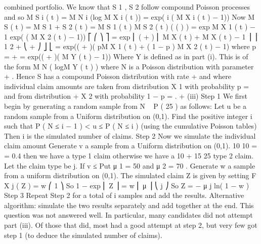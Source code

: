 \documentclass[a4paper,12pt]{article}
\begin{document}
combined portfolio. We know that S 1 , S 2 follow compound Poisson processes
and so
M S i ( t ) = M N i (log M X i ( t )) = exp( \lambda i ( M X i ( t ) − 1))
Now
M S ( t ) = M S 1 + S 2 ( t ) = M S 1 ( t ) M S 2 ( t )
( (
) )
= exp  M X 1 ( t ) − 1 exp(  ( M X 2 ( t ) − 1))
⎡
⎛ 
⎞ ⎤
= exp ⎢ (  +  ) ⎜
M X ( t ) +
M X ( t ) − 1 ⎟ ⎥
1
2
 + 
⎝  + 
⎠ ⎦
⎣
= exp((  +  )( pM X 1 ( t ) + ( 1 − p ) M X 2 ( t ) − 1) where p =
 + 
= exp((  +  )( M Y ( t ) − 1))
Where Y is defined as in part (i). This is of the form M N ( logM Y ( t ) ) where N
is a Poisson distribution with parameter  +  . Hence S has a compound
Poisson distribution with rate  +  and where individual claim amounts are
taken from distribution X 1 with probability p =
and from distribution
 + 
X 2 with probability 1 − p =
.
 + 
(iii)
Step 1
We first begin by generating a random sample from N ~ P ( 25 ) as follows:
Let u be a random sample from a Uniform distribution on (0,1).
Find the positive integer i such that P ( N ≤ i − 1 ) < u ≤ P ( N ≤ i ) (using the
cumulative Poisson tables)
Then i is the simulated number of claims.
Step 2
Now we simulate the individual claim amount
Generate v a sample from a Uniform distribution on (0,1).
10
10
=
= 0.4 then we have a type 1 claim otherwise we have a
10 + 15 25
type 2 claim. Let the claim type be j.
If v ≤
Put μ 1 = 50 and μ 2 = 70 . Generate w a sample from a uniform distribution on
(0,1).
The simulated claim Z is given by setting
F X j ( Z ) = w
⎛ 1 ⎞
So 1 − exp ⎜
Z ⎟ = w
⎜ μ
⎟
⎝ j ⎠
So Z = − μ j ln( 1 − w )
Step 3
Repeat Step 2 for a total of i samples and add the results.
Alternative algorithm: simulate the two results separately and add together at
the end.
This question was not answered well. In particular, many candidates did not attempt part
(iii). Of those that did, most had a good attempt at step 2, but very few got step 1 (to deduce
the simulated number of claims).
\end{document}
